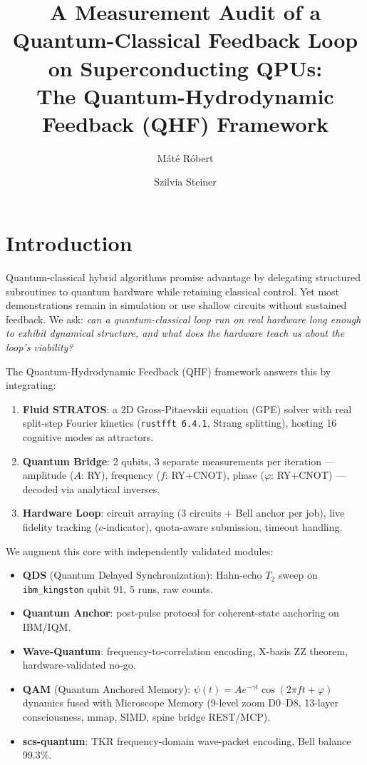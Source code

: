 \documentclass[sigconf,anonymous=false]{acmart}
\title{A Measurement Audit of a Quantum-Classical Feedback Loop on Superconducting QPUs: \\ The Quantum-Hydrodynamic Feedback (QHF) Framework}
\author{Máté Róbert}
\affiliation{
  \institution{Independent Researcher}
  \streetaddress{Budapest}
  \country{Hungary}
}
\author{Szilvia Steiner}
\affiliation{
  \institution{Independent Researcher}
  \country{Hungary}
}
\begin{document}
\maketitle

\section{Introduction}

Quantum-classical hybrid algorithms promise advantage by delegating structured subroutines to quantum hardware while retaining classical control. Yet most demonstrations remain in simulation or use shallow circuits without sustained feedback. We ask: \emph{can a quantum-classical loop run on real hardware long enough to exhibit dynamical structure, and what does the hardware teach us about the loop's viability?}

The Quantum-Hydrodynamic Feedback (QHF) framework answers this by integrating:
\begin{enumerate}
\item \textbf{Fluid STRATOS}: a 2D Gross-Pitaevskii equation (GPE) solver with real split-step Fourier kinetics (\texttt{rustfft 6.4.1}, Strang splitting), hosting 16 cognitive modes as attractors.
\item \textbf{Quantum Bridge}: 2 qubits, 3 separate measurements per iteration --- amplitude ($A$: RY), frequency ($f$: RY+CNOT), phase ($\varphi$: RY+CNOT) --- decoded via analytical inverses.
\item \textbf{Hardware Loop}: circuit arraying (3 circuits + Bell anchor per job), live fidelity tracking ($c$-indicator), quota-aware submission, timeout handling.
\end{enumerate}

We augment this core with independently validated modules:
\begin{itemize}
\item \textbf{QDS} (Quantum Delayed Synchronization): Hahn-echo $T_2$ sweep on \texttt{ibm\_kingston} qubit 91, 5 runs, raw counts.
\item \textbf{Quantum Anchor}: post-pulse protocol for coherent-state anchoring on IBM/IQM.
\item \textbf{Wave-Quantum}: frequency-to-correlation encoding, X-basis ZZ theorem, hardware-validated no-go.
\item \textbf{QAM} (Quantum Anchored Memory): $\psi(t) = A e^{-\gamma t} \cos(2\pi f t + \varphi)$ dynamics fused with Microscope Memory (9-level zoom D0--D8, 13-layer consciousness, mmap, SIMD, spine bridge REST/MCP).
\item \textbf{scs-quantum}: TKR frequency-domain wave-packet encoding, Bell balance 99.3\%.
\end{itemize}
\end{document}
